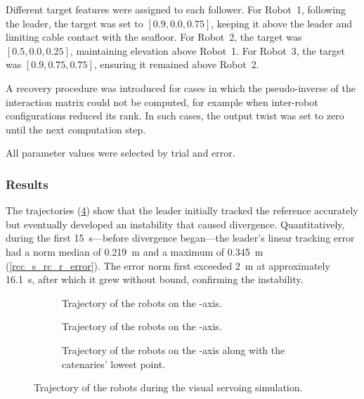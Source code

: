 Different target features were assigned to each follower. For Robot~1, following the leader, the
target was set to $\left[0.9, 0.0, 0.75\right]$, keeping it above the leader and limiting cable
contact with the seafloor. For Robot~2, the target was $\left[0.5, 0.0, 0.25\right]$, maintaining
elevation above Robot~1. For Robot~3, the target was $\left[0.9, 0.75, 0.75\right]$, ensuring it
remained above Robot~2.

A recovery procedure was introduced for cases in which the pseudo-inverse of the interaction matrix
could not be computed, for example when inter-robot configurations reduced its rank. In such cases,
the output twist was set to zero until the next computation step.

All parameter values were selected by trial and error.

\subsubsection{Results}
\label{rcc_s_rc_results}

The trajectories (\cref{rcc_s_rc_r_poses}) show that the leader initially tracked the reference
accurately but eventually developed an instability that caused divergence. Quantitatively, during
the first \qty{15}{\s}---before divergence began---the leader's linear tracking error had a norm
median of \qty{0.219}{\m} and a maximum of \qty{0.345}{\m} (\cref{rcc_s_rc_r_error}). The error
norm first exceeded \qty{2}{\m} at approximately \qty{16.1}{\s}, after which it grew without bound,
confirming the instability.

\begin{figure}
	\centering
	\begin{subfigure}{\figurewidth}
		\centering
		\caption{Trajectory of the robots on the -axis.}
		\label{rcc_s_rc_r_pose_x}
	\end{subfigure}
	\begin{subfigure}{\figurewidth}
		\centering
		\caption{Trajectory of the robots on the -axis.}
		\label{rcc_s_rc_r_pose_y}
	\end{subfigure}
	\begin{subfigure}{\figurewidth}
		\centering
		\caption{Trajectory of the robots on the -axis along with the catenaries' lowest point.}
		\label{rcc_s_rc_r_pose_z}
	\end{subfigure}
	\caption{Trajectory of the robots during the visual servoing simulation.}
	\label{rcc_s_rc_r_poses}
\end{figure}

